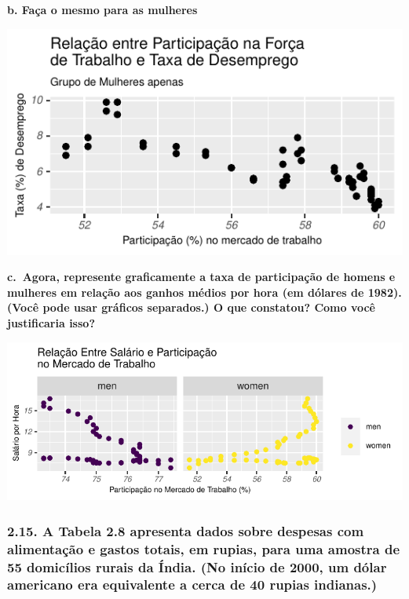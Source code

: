 \documentclass[
  11pt,
  a4paper,
]{article}
\begin{document}
\textbf{b. Faça o mesmo para as mulheres}

\begin{center}\includegraphics{article_files/figure-latex/unnamed-chunk-14-1} \end{center}

\textbf{c.~Agora, represente graficamente a taxa de participação de homens e mulheres em relação aos ganhos médios por hora (em dólares de 1982). (Você pode usar gráficos separados.) O que constatou? Como você justificaria isso?}

\begin{center}\includegraphics{article_files/figure-latex/unnamed-chunk-15-1} \end{center}

\hypertarget{a-tabela-2.8-apresenta-dados-sobre-despesas-com-alimentauxe7uxe3o-e-gastos-totais-em-rupias-para-uma-amostra-de-55-domicuxedlios-rurais-da-uxedndia.-no-inuxedcio-de-2000-um-duxf3lar-americano-era-equivalente-a-cerca-de-40-rupias-indianas.}{%
\subsubsection{2.15. A Tabela 2.8 apresenta dados sobre despesas com alimentação e gastos totais, em rupias, para uma amostra de 55 domicílios rurais da Índia. (No início de 2000, um dólar americano era equivalente a cerca de 40 rupias indianas.)}\label{a-tabela-2.8-apresenta-dados-sobre-despesas-com-alimentauxe7uxe3o-e-gastos-totais-em-rupias-para-uma-amostra-de-55-domicuxedlios-rurais-da-uxedndia.-no-inuxedcio-de-2000-um-duxf3lar-americano-era-equivalente-a-cerca-de-40-rupias-indianas.}}
\end{document}
